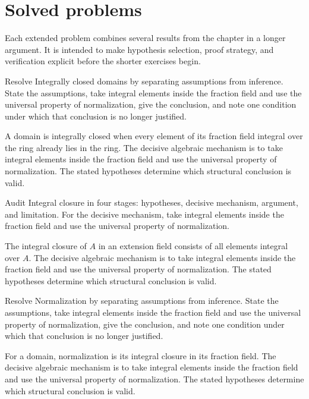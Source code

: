 \section{Solved problems}
Each extended problem combines several results from the chapter in a longer argument. It is intended to make hypothesis selection, proof strategy, and verification explicit before the shorter exercises begin.

\begin{problem}\label{prob:v20-problem-01}
Resolve Integrally closed domains by separating assumptions from inference. State the assumptions, take integral elements inside the fraction field and use the universal property of normalization, give the conclusion, and note one condition under which that conclusion is no longer justified.
\end{problem}
\begin{solution}
A domain is integrally closed when every element of its fraction field integral over the ring already lies in the ring. The decisive algebraic mechanism is to take integral elements inside the fraction field and use the universal property of normalization. The stated hypotheses determine which structural conclusion is valid.
\end{solution}

\begin{problem}\label{prob:v20-problem-02}
Audit Integral closure in four stages: hypotheses, decisive mechanism, argument, and limitation. For the decisive mechanism, take integral elements inside the fraction field and use the universal property of normalization.
\end{problem}
\begin{solution}
The integral closure of $A$ in an extension field consists of all elements integral over $A$. The decisive algebraic mechanism is to take integral elements inside the fraction field and use the universal property of normalization. The stated hypotheses determine which structural conclusion is valid.
\end{solution}

\begin{problem}\label{prob:v20-problem-03}
Resolve Normalization by separating assumptions from inference. State the assumptions, take integral elements inside the fraction field and use the universal property of normalization, give the conclusion, and note one condition under which that conclusion is no longer justified.
\end{problem}
\begin{solution}
For a domain, normalization is its integral closure in its fraction field. The decisive algebraic mechanism is to take integral elements inside the fraction field and use the universal property of normalization. The stated hypotheses determine which structural conclusion is valid.
\end{solution}

